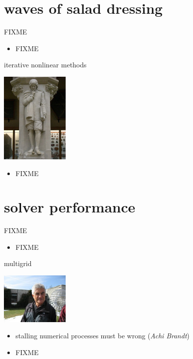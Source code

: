 \documentclass[10pt,hyperref,dvipsnames]{beamer}
\begin{document}
\section{waves of salad dressing}

\begin{frame}{FIXME}

\begin{itemize}
\item FIXME
\end{itemize}
\end{frame}


\begin{frame}{iterative nonlinear methods}

\hfill \includegraphics[width=0.25\textwidth]{figs/people/inewton.jpg}

\vspace{-20mm}
\begin{itemize}
\item FIXME
\end{itemize}
\end{frame}


\section{solver performance}

\begin{frame}{FIXME}

\begin{itemize}
\item FIXME
\end{itemize}
\end{frame}

\begin{frame}{multigrid}

\hfill \includegraphics[width=0.25\textwidth]{figs/people/abrandt.jpg}

\begin{itemize}
\item stalling numerical processes must be wrong (\emph{Achi Brandt})
\item FIXME
\end{itemize}
\end{frame}
\end{document}
